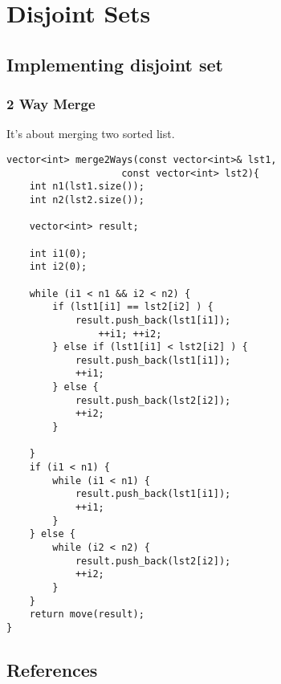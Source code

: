 \chapter{Disjoint Sets}
\section{Implementing disjoint set}

\subsection{2 Way Merge}

It's about merging two sorted list.

\color{blue}
\begin{lstlisting}
vector<int> merge2Ways(const vector<int>& lst1,
 					const vector<int> lst2){
	int n1(lst1.size());
	int n2(lst2.size());
	
	vector<int> result;
	
	int i1(0);
	int i2(0);
	
	while (i1 < n1 && i2 < n2) {
		if (lst1[i1] == lst2[i2] ) {
			result.push_back(lst1[i1]);
				++i1; ++i2;
		} else if (lst1[i1] < lst2[i2] ) {
			result.push_back(lst1[i1]);
			++i1;
		} else {
			result.push_back(lst2[i2]);
			++i2;
		}
	
	}
	if (i1 < n1) {
		while (i1 < n1) {
			result.push_back(lst1[i1]);
			++i1;
		}
	} else {
		while (i2 < n2) {
			result.push_back(lst2[i2]);
			++i2;
		}
	}
	return move(result);
}
\end{lstlisting}
\color{black}
\section{References}

